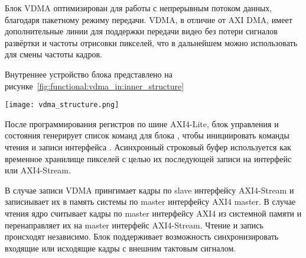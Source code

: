 Блок VDMA оптимизирован для работы с непрерывным потоком данных, благодаря пакетному режиму передачи.
VDMA, в отличие от AXI DMA, имеет дополнительные линии для поддержки передачи видео без потери
сигналов развёртки и частоты отрисовки пикселей, что в дальнейшем можно использовать для смены частоты кадров.

Внутреннее устройство блока представлено на рисунке~\ref{fig:functional:vdma_in:inner_structure}

\begin{center}
  \centering
  \texttt{[image: vdma\_structure.png]}
  \label{fig:functional:vdma_in:inner_structure}
\end{center}

После программирования регистров по шине AXI4-Lite, блок управления и состояния генерирует список команд
для блока , чтобы инициировать команды чтения и записи интерфейса .
Асинхронный строковый буфер используется как временное хранилище пикселей с целью их последующей
записи на интерфейс  или AXI4-Stream.

В случае записи VDMA прингимает кадры по slave интерфейсу AXI4-Stream и записиывает
их в память системы по master интерфейсу AXI4 master. В случае чтения ядро считывает
кадры по master интерфейсу AXI4 из системной памяти и перенаправляет их на master интерфейс
AXI4-Stream. Чтение и запись происходят независимо. Блок поддерживает возможность синхронизировать
входящие или исходящие кадры с внешним тактовым сигналом.

